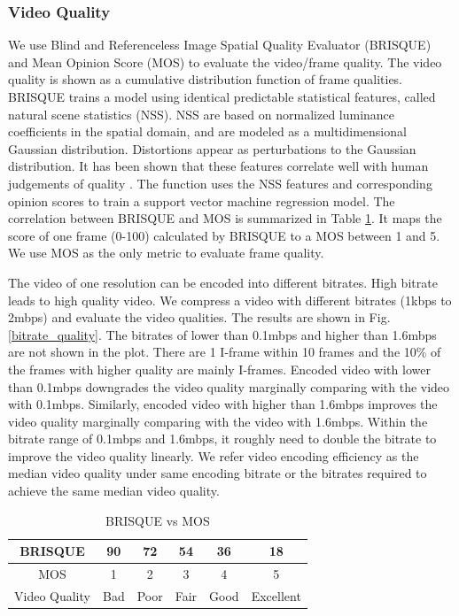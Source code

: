 \subsubsection{Video Quality}
\label{sec_quality}


We use Blind and Referenceless Image Spatial Quality Evaluator (BRISQUE) 
\cite{mittal2012no} and Mean Opinion Score (MOS) \cite{bauman2017towards}
to evaluate the video/frame quality. 
The video quality is shown as a cumulative distribution function of frame qualities.  
BRISQUE trains a model using identical predictable statistical features, 
called natural scene statistics (NSS). 
NSS are based on normalized luminance coefficients in the spatial domain, 
and are modeled as a multidimensional Gaussian distribution. 
Distortions appear as perturbations to the Gaussian distribution.
It has been shown that these features correlate well with 
human judgements of quality \cite{mittal2012no, bauman2017towards}. 
The function uses the NSS features and corresponding opinion scores to train
a support vector machine regression model. 
The correlation between BRISQUE and MOS is summarized in Table \ref{brisque}.
It maps the score of one frame (0-100) calculated by BRISQUE to 
a MOS between 1 and 5. 
We use MOS as the only metric to evaluate frame quality. 

The video of one resolution can be encoded into different bitrates. 
High bitrate leads to high quality video. 
We compress a video with different bitrates (1kbps to 2mbps) and evaluate the video qualities.
The results are shown in Fig. \ref{bitrate_quality}. 
The bitrates of lower than 0.1mbps and higher than 1.6mbps are not shown 
in the plot. 
There are 1 I-frame within 10 frames 
and the 10\% of the frames with higher quality are mainly I-frames.  
Encoded video with lower than 0.1mbps downgrades the video quality marginally
comparing with the video with 0.1mbps. 
Similarly, encoded video with higher than 1.6mbps improves the
video quality marginally comparing with the video with 1.6mbps. 
Within the bitrate range of 0.1mbps and 1.6mbps, 
it roughly need to double the bitrate to improve the video quality linearly. 
We refer video encoding efficiency as the median video quality under
same encoding bitrate or the bitrates required to achieve the same
median video quality. 



\begin{table}[t]
  \centering
  \caption[psnr]{BRISQUE vs MOS}
  \vspace{-0.0cm}
  \label{brisque}
  \begin{tabular}{|c|c|c|c|c|c|}
  \hline
BRISQUE & 90 & 72 & 54 & 36 & 18
\\  \hline
MOS & 1 & 2 & 3 & 4 & 5
\\  \hline
Video Quality & Bad & Poor & Fair & Good & Excellent 
\\  \hline      
  \end{tabular}
  \vspace{-0.0cm}
\end{table}


